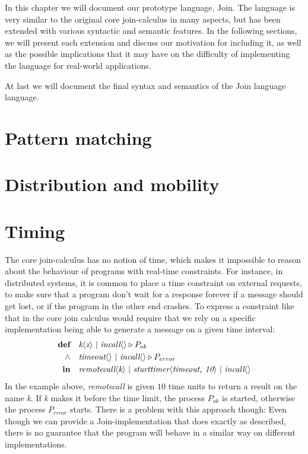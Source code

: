 In this chapter we will document our prototype language, Join.  The language is
very similar to the original core join-calculus in many aspects, but has been
extended with various syntactic and semantic features. In the following
sections, we will present each extension and discuss our motivation for
including it, as well as the possible implications that it may have on the
difficulty of implementing the language for real-world applications.

At last we will document the final syntax and semantics of the Join language
language.


\section{Pattern matching}

\section{Distribution and mobility}

\section{Timing}

The core join-calculus has no notion of time, which makes it impossible to
reason about the behaviour of programs with real-time constraints.
For instance, in distributed systems, it is common to place a time constraint
on external requests, to make sure that a program don't wait for a response
forever if a message should get lost, or if the program in the other end
crashes. To express a constraint like that in the core join calculus would
require that we rely on a specific implementation being able to generate a
message on a given time interval:
\begin{align*}
  \textbf{def}\quad & \S k<x> ~|~ \S incall<> \triangleright P_{ok} \\
  \land\quad & \S timeout<> ~|~ \S incall<> \triangleright P_{error} \\
  \textbf{in}\quad & \S remotecall<k> ~|~ \S starttimer<timeout, 10> ~|~ \S incall<>
\end{align*}
In the example above, \emph{remotecall} is given $10$ time units to return a
result on the name \emph{k}. If \emph{k} makes it before the time limit, the
process $P_{ok}$ is started, otherwise the process $P_{error}$ starts.
There is a problem with this approach though: Even though we can provide a
Join-implementation that does exactly as described, there is no guarantee that
the program will behave in a similar way on different implementations.

